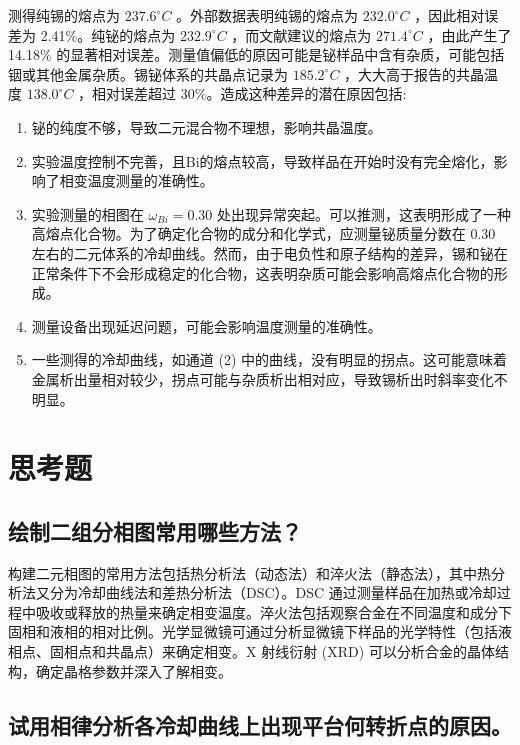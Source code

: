 \documentclass[12pt,hyperref,a4paper,UTF8]{ctexart}
\begin{document}
测得纯锡的熔点为 $237.6^{\circ}C$ 。外部数据表明纯锡的熔点为 $232.0^{\circ}C$ \cite{1}，因此相对误差为 2.41\%。纯铋的熔点为 $232.9^{\circ}C$ ，而文献建议的熔点为 $271.4^{\circ}C$ \cite{1}，由此产生了 14.18\% 的显著相对误差。测量值偏低的原因可能是铋样品中含有杂质，可能包括铟或其他金属杂质。锡铋体系的共晶点记录为 $185.2^{\circ}C$ ，大大高于报告的共晶温度 $138.0^{\circ}C$ \cite{1}，相对误差超过 30\%。造成这种差异的潜在原因包括:
\begin{enumerate}
    \item 铋的纯度不够，导致二元混合物不理想，影响共晶温度。
    \item 实验温度控制不完善，且Bi的熔点较高，导致样品在开始时没有完全熔化，影响了相变温度测量的准确性。
    \item 实验测量的相图在 $\omega _{Bi} = 0.30$ 处出现异常突起。可以推测，这表明形成了一种高熔点化合物。为了确定化合物的成分和化学式，应测量铋质量分数在 0.30 左右的二元体系的冷却曲线。然而，由于电负性和原子结构的差异，锡和铋在正常条件下不会形成稳定的化合物，这表明杂质可能会影响高熔点化合物的形成。
    \item 测量设备出现延迟问题，可能会影响温度测量的准确性。
    \item  一些测得的冷却曲线，如通道 (2) 中的曲线，没有明显的拐点。这可能意味着金属析出量相对较少，拐点可能与杂质析出相对应，导致锡析出时斜率变化不明显。
\end{enumerate}



\section{思考题}
   
\subsection{绘制二组分相图常用哪些方法？}
    
构建二元相图的常用方法包括热分析法（动态法）和淬火法（静态法），其中热分析法又分为冷却曲线法和差热分析法（DSC）。DSC 通过测量样品在加热或冷却过程中吸收或释放的热量来确定相变温度。淬火法包括观察合金在不同温度和成分下固相和液相的相对比例。光学显微镜可通过分析显微镜下样品的光学特性（包括液相点、固相点和共晶点）来确定相变。X 射线衍射 (XRD) 可以分析合金的晶体结构，确定晶格参数并深入了解相变。
    
\subsection{试用相律分析各冷却曲线上出现平台何转折点的原因。}
    
\end{document}
